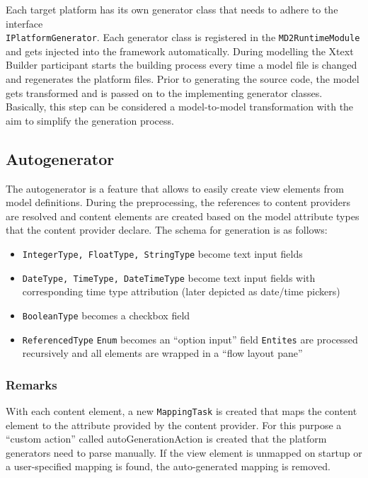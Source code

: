 

Each target platform has its own generator class that needs to adhere to the interface \\ \lstinline|IPlatformGenerator|. Each generator class is registered in the \lstinline|MD2RuntimeModule| and gets injected into the framework automatically. During modelling the Xtext Builder participant starts the building process every time a model file is changed and regenerates the platform files.
Prior to generating the source code, the model gets transformed and is passed on to the implementing generator classes. Basically, this step can be considered a model-to-model transformation with the aim to simplify the generation process.

\subsection{Autogenerator}
The autogenerator is a feature that allows to easily create view elements from model definitions. During the preprocessing, the references to content providers are resolved and content elements are created based on the model attribute types that the content provider declare. The schema for generation is as follows:

\begin{itemize}
	\item \lstinline!IntegerType, FloatType, StringType! become text input fields
	\item \lstinline!DateType, TimeType, DateTimeType! become text input fields with corresponding time type attribution (later depicted as date/time pickers)
	\item \lstinline!BooleanType! becomes a checkbox field
	\item \lstinline!ReferencedType!
		\subitem \lstinline!Enum! becomes an \enquote{option input} field
		\subitem \lstinline!Entites! are processed recursively and all elements are wrapped in a \enquote{flow layout pane}
\end{itemize}

\subsubsection{Remarks}
With each content element, a new \lstinline!MappingTask! is created that maps the content element to the attribute provided by the content provider. For this purpose a \enquote{custom action} called autoGenerationAction is created that the platform generators need to parse manually. If the view element is unmapped on startup or a user-specified mapping is found, the auto-generated mapping is removed.

